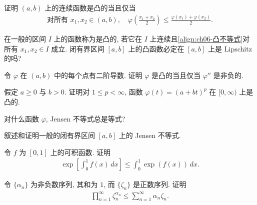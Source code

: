 \documentclass[../../main.tex]{subfiles}
\begin{document}
\begin{exercise}\label{exercise:ch06-62}
证明 $(a,b)$ 上的连续函数是凸的当且仅当
\begin{align*}
\text{对所有 }x_{1},x_{2}\in(a,b),\quad\varphi\left(\frac{x_{1}+x_{2}}{2}\right)\leqslant\frac{\varphi(x_{1})+\varphi(x_{2})}{2}.
\end{align*}
\end{exercise}

\begin{exercise}\label{exercise:ch06-63}
在一般的区间 $I$ 上的函数称为是凸的, 若它在 $I$ 上连续且\eqref{align:ch06-凸不等式}对所有 $x_{1},x_{2}\in I$ 成立. 闭有界区间 $[a,b]$ 上的凸函数必定在 $[a,b]$ 上是 Lipschitz 的吗?
\end{exercise}

\begin{exercise}\label{exercise:ch06-64}
令 $\varphi$ 在 $(a,b)$ 中的每个点有二阶导数. 证明 $\varphi$ 是凸的当且仅当 $\varphi''$ 是非负的.
\end{exercise}

\begin{exercise}\label{exercise:ch06-65}
假定 $a\geqslant 0$ 与 $b>0$. 证明对 $1\leqslant p<\infty$, 函数 $\varphi(t)=(a+bt)^{p}$ 在 $[0,\infty)$ 上是凸的.
\end{exercise}

\begin{exercise}\label{exercise:ch06-66}
对什么函数 $\varphi$, Jensen 不等式总是等式?
\end{exercise}

\begin{exercise}\label{exercise:ch06-67}
叙述和证明一般的闭有界区间 $[a,b]$ 上的 Jensen 不等式.
\end{exercise}

\begin{exercise}\label{exercise:ch06-68}
令 $f$ 为 $[0,1]$ 上的可积函数. 证明
\begin{align*}
\exp\left[\int_{0}^{1}f(x)\,dx\right]\leqslant\int_{0}^{1}\exp(f(x))\,dx.
\end{align*}
\end{exercise}

\begin{exercise}\label{exercise:ch06-69}
令 $\{\alpha_{n}\}$ 为非负数序列, 其和为 $1$, 而 $\{\zeta_{n}\}$ 是正数序列. 证明
\begin{align*}
\prod_{n=1}^{\infty}\zeta_{n}^{\alpha_{n}}\leqslant\sum_{n=1}^{\infty}\alpha_{n}\zeta_{n}.
\end{align*}
\end{exercise}
\end{document}
